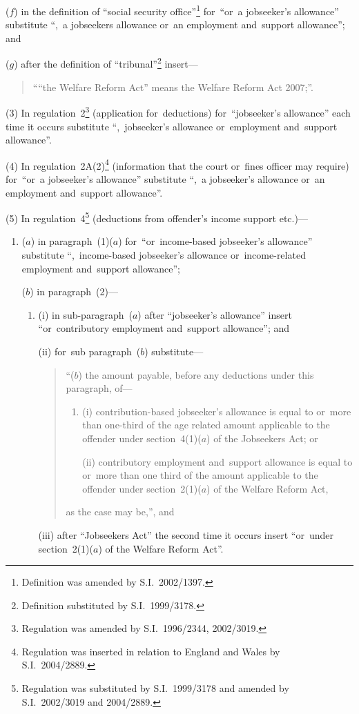 \documentclass[12pt,a4paper]{article}
\begin{document}
\begin{enumerate}
($f$) in the definition of “social security office”\footnote{Definition was amended by S.I.~2002/1397.} for~“or~a jobseeker’s allowance” substitute “,~a jobseekers allowance or~an employment and~support allowance”; and

($g$) after the definition of “tribunal”\footnote{Definition substituted by S.I.~1999/3178.} insert—
\begin{quotation}
““the Welfare Reform Act” means the Welfare Reform Act 2007;”.
\end{quotation}
\end{enumerate}

(3) In regulation~2\footnote{Regulation was amended by S.I.~1996/2344, 2002/3019.} (application for~deductions) for~“jobseeker’s allowance” each time it occurs substitute “,~jobseeker’s allowance or~employment and~support allowance”.

(4) In regulation~2A(2)\footnote{Regulation was inserted in relation to England and Wales by S.I.~2004/2889.} (information that the court or~fines officer may require) for~“or~a jobseeker’s allowance” substitute “,~a jobseeker’s allowance or~an employment and~support allowance”.

(5) In regulation~4\footnote{Regulation was substituted by S.I.~1999/3178 and amended by S.I.~2002/3019 and 2004/2889.} (deductions from offender’s income support etc.)—
\begin{enumerate}\item[]
($a$) in paragraph~(1)($a$)  for~“or~income-based jobseeker’s allowance” substitute “,~income-based jobseeker’s allowance or~income-related employment and~support allowance”;

($b$) in paragraph~(2)—
\begin{enumerate}\item[]
(i) in sub-paragraph~($a$)  after “jobseeker’s allowance” insert “or~contributory employment and~support allowance”; and

(ii) for~sub paragraph~($b$)  substitute—
\begin{quotation}
“($b$) the amount payable, before any deductions under this paragraph, of—
\begin{enumerate}\item[]
(i) contribution-based jobseeker’s allowance is equal to or~more than one-third of the age related amount applicable to the offender under section~4(1)($a$)  of the Jobseekers Act; or

(ii) contributory employment and~support allowance is equal to or~more than one third of the amount applicable to the offender under section~2(1)($a$)  of the Welfare Reform Act,
\end{enumerate}
as the case may be,”, and
\end{quotation}

(iii) after “Jobseekers Act” the second time it occurs insert “or~under section~2(1)($a$)  of the Welfare Reform Act”.
\end{enumerate}
\end{enumerate}
\end{document}
